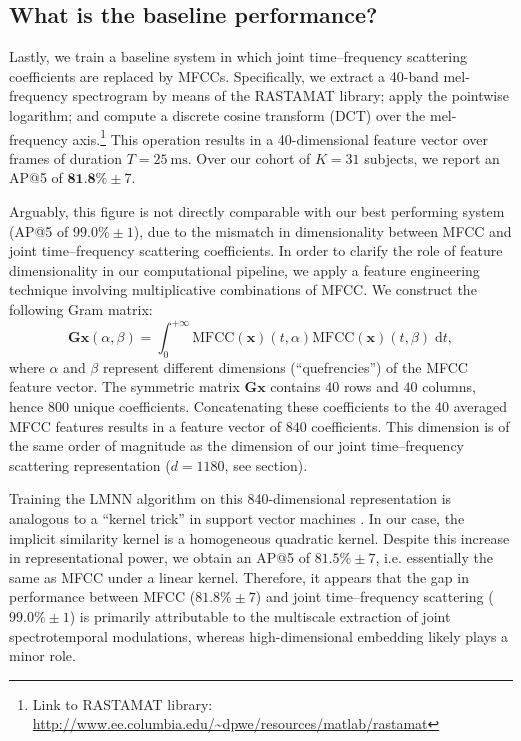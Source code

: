 \documentclass{bmcart}
\newcommand{\lnameref}[1]{%
\bgroup
\let\nmu\MakeLowercase
\nameref{#1}\egroup}
\newcommand{\nmu}{}
\begin{document}
\subsection*{What is the baseline performance?}
Lastly, we train a baseline system in which joint time--frequency scattering coefficients are replaced by MFCCs.
Specifically, we extract a 40-band mel-frequency spectrogram by means of the RASTAMAT library; apply the pointwise logarithm; and compute a discrete cosine transform (DCT) over the mel-frequency axis.\footnote{Link to RASTAMAT library: \url{http://www.ee.columbia.edu/~dpwe/resources/matlab/rastamat}}
This operation results in a 40-dimensional feature vector over frames of duration $T=\SI{25}{\milli\second}$.
Over our cohort of $K=31$ subjects, we report an AP@5 of $\textbf{81.8\%} \pm 7$.

Arguably, this figure is not directly comparable with our best performing system (AP@5 of $99.0\%\pm 1$), due to the mismatch in dimensionality between MFCC and joint time--frequency scattering coefficients.
In order to clarify the role of feature dimensionality in our computational pipeline, we apply a feature engineering technique involving multiplicative combinations of MFCC.
We construct the following Gram matrix:
\begin{equation}
\mathbf{G} \boldsymbol{x}(\alpha, \beta) =
\int_0^{+\infty}
\mathrm{MFCC}(\boldsymbol{x})(t, \alpha)
\mathrm{MFCC}(\boldsymbol{x})(t, \beta)
\;\mathrm{d}t,
\end{equation}
where $\alpha$ and $\beta$ represent different dimensions (``quefrencies'') of the MFCC feature vector.
The symmetric matrix $\mathbf{G}\boldsymbol{x}$ contains $40$ rows and $40$ columns, hence $800$ unique coefficients.
Concatenating these coefficients to the $40$ averaged MFCC features results in a feature vector of $840$ coefficients.
This dimension is of the same order of magnitude as the dimension of our joint time--frequency scattering representation ($d=1180$, see \lnameref{sec:methods} section).

Training the LMNN algorithm on this 840-dimensional representation is analogous to a ``kernel trick'' in support vector machines \cite{chang2010jmlr}.
In our case, the implicit similarity kernel is a homogeneous quadratic kernel.
Despite this increase in representational power, we obtain an AP@5 of $81.5\% \pm 7$, i.e. essentially the same as MFCC under a linear kernel.
Therefore, it appears that the gap in performance between MFCC ($81.8\%\pm 7$) and joint time--frequency scattering ($99.0\% \pm 1$) is primarily attributable to the multiscale extraction of joint spectrotemporal modulations, whereas high-dimensional embedding likely plays a minor role.
\end{document}
